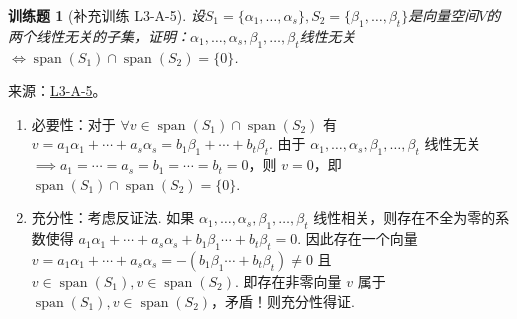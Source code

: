 \documentclass[UTF8,12pt,a4paper,fontset=fandol]{ctexart}
\newtheorem{exercise}{训练题}[section]
\begin{document}
\begin{exercise}[补充训练 L3-A-5]\label{prob:L3-A-5}
设$S_1=\{\alpha_1,\ldots,\alpha_s\},S_2=\{\beta_1,\ldots,\beta_t\}$是向量空间$V$的两个线性无关的子集，证明：$\alpha_1,\ldots,\alpha_s,\beta_1,\ldots,\beta_t$线性无关$\iff \operatorname{span}(S_1)\cap \operatorname{span}(S_2)=\{0\}$.
\end{exercise}
\noindent 来源：\href{https://github.com/yhwu-is/Linear-Algebra-Left-Undone/blob/new/%E8%AE%B2%E4%B9%89/%E4%B8%93%E9%A2%98/3%20%E6%9C%89%E9%99%90%E7%BB%B4%E7%BA%BF%E6%80%A7%E7%A9%BA%E9%97%B4.tex}{L3-A-5}。
\begin{solve}
\begin{enumerate}
                \item 必要性：对于 $\forall v\in\operatorname{span}(S_1) \cap \operatorname{span}(S_2)$ 有 $v=a_1\alpha_1+\cdots+a_s\alpha_s=b_1\beta_1+\cdots+b_t\beta_t$. 由于 $\alpha_1,\ldots,\alpha_s,\beta_1,\ldots,\beta_t$ 线性无关 $\implies a_1=\cdots=a_s=b_1=\cdots=b_t=0$，则 $v=0$，即 $\operatorname{span}(S_1)\cap\operatorname{span}(S_2)=\{0\}$.

                \item 充分性：考虑反证法. 如果 $\alpha_1,\ldots,\alpha_s,\beta_1,\ldots,\beta_t$ 线性相关，则存在不全为零的系数使得 $a_1\alpha_1+\cdots+a_s\alpha_s+b_1\beta_1\cdots+b_t\beta_t=0$. 因此存在一个向量 $v=a_1\alpha_1+\cdots+a_s\alpha_s=-(b_1\beta_1\cdots+b_t\beta_t)\neq 0$ 且 $v\in\operatorname{span}(S_1),v\in\operatorname{span}(S_2)$. 即存在非零向量 $v$ 属于 $\operatorname{span}(S_1),v\in\operatorname{span}(S_2)$，矛盾！则充分性得证.
            \end{enumerate}
\end{solve}
\end{document}

